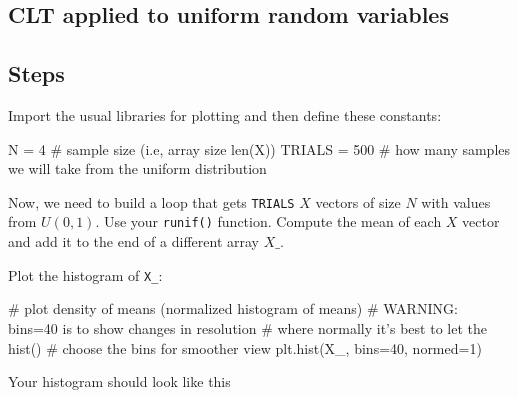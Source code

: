 \begin{fullwidth}
\section{CLT applied to uniform random variables}


\subsection{Steps}

\step Import the usual libraries for plotting and then define these constants:

\begin{pyverbatim}
N = 4  # sample size (i.e, array size len(X))
TRIALS = 500 # how many samples we will take from the uniform distribution
\end{pyverbatim}

\noindent Now, we need to build a loop that gets  {\tt TRIALS} $X$ vectors of size $N$ with values from $U(0,1)$. Use your {\tt runif()} function. Compute the mean of each $X$ vector and add it to the end of a different array $X\_$.

\step Plot the histogram of {\tt X\_}:

\begin{pyverbatim}
# plot density of means (normalized histogram of means)
# WARNING: bins=40 is to show changes in resolution
#          where normally it's best to let the hist()
#          choose the bins for smoother view
plt.hist(X_, bins=40, normed=1)
\end{pyverbatim}

\step Your histogram should look like this \\

    

\end{fullwidth}
